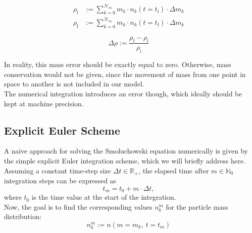         \begin{align}
            \rho_\text{i}
                &:=\sum_{k=0}^{\mathcal N_m} m_k\cdot n_k(t=t_\text{i})\cdot\Delta m_k
            \\
            \rho_\text{f}
                &:=\sum_{k=0}^{\mathcal N_m} m_k\cdot n_k(t=t_\text{f})\cdot\Delta m_k
        \end{align}

        
        \begin{equation}
            \Delta\rho
                :=\frac{\rho_\text{f}-\rho_\text{i}}{\rho_\text{i}}
        \end{equation}

        In reality, this mass error should be exactly equal to zero. Otherwise, mass conservation would not be given, since the movement of mass from one point in space to another is not included in our model. \\
        
        The numerical integration introduces an error though, which ideally should be kept at machine precision. %

    \subsection{Explicit Euler Scheme}

        A naive approach for solving the Smoluchowski equation numerically is given by the simple 
        explicit Euler integration scheme, which we will briefly address here. Assuming a constant 
        time-step size $\Delta t\in\mathbb R_+$, the elapsed time after $m\in\mathbb N_0$ integration 
        steps can be expressed as 
        \begin{equation}
            t_m
                =t_0+m\cdot\Delta t,
        \end{equation}
        where $t_0$ is the time value at the start of the integration.\\
        
        Now, the goal is to find the corresponding values $n_k^m$ for the particle mass 
        distribution:
        \begin{equation}
            n_k^m
                :=n(m=m_k,\ t=t_m)
        \end{equation}
        
